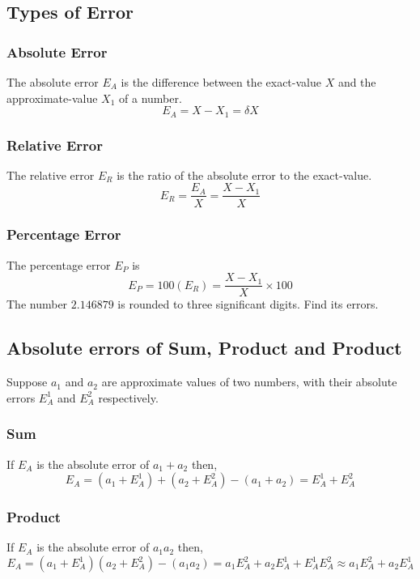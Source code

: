 \documentclass[aima203_lecturenotes_ku.tex]{subfiles}
\begin{document}
\subsection{Types of Error}
\subsubsection{Absolute Error}
The absolute error \(E_A\) is the difference between the exact-value \(X\) and the approximate-value \(X_1\) of a number.
\begin{equation}
  \label{eq:1}
  E_A = X-X_1 = \delta X
\end{equation}

\subsubsection{Relative Error}
The relative error \(E_R\) is the ratio of the absolute error to the exact-value.
\begin{equation}
  \label{eq:2}
  E_R = \frac{E_A}{X} = \frac{X-X_1}{X}
\end{equation}

\subsubsection{Percentage Error}
The percentage error \(E_P\) is
\begin{equation}
  \label{eq:3}
  E_P = 100(E_R) = \frac{X-X_1}{X} \times 100
\end{equation}
The number $2.146879$ is rounded to three significant digits. Find its errors.

\subsection{Absolute errors of Sum, Product and Product}
Suppose \(a_1\) and \(a_2\) are approximate values of two  numbers, with their absolute errors \(E_A^1\) and \(E_A^2\) respectively.

\subsubsection{Sum}
If \(E_A\) is the absolute error of \(a_1 + a_2\) then,
\begin{equation}
  \label{eq:4}
  E_A = (a_1 + E_A^1) + (a_2 +E_A^2) -(a_1+a_2) = E_A^1 +E_A^2
\end{equation}

\subsubsection{Product}
If \(E_A\) is the absolute error of \(a_1 a_2\) then,
\begin{equation}
  \label{eq:5}
  E_A = (a_1 + E_A^1) (a_2 +E_A^2) -(a_1a_2) = a_1E_A^2 +a_2E_A^1+E_A^1E_A^2 \approx a_1E_A^2 +a_2E_A^1
\end{equation}
\end{document}

